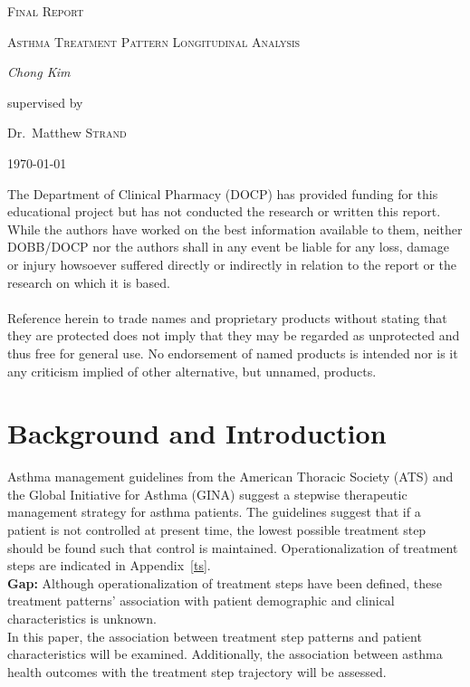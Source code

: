 \documentclass[10pt,a4paper,fleqn]{article}
\author{Chong Kim}
\begin{document}
\begin{titlepage}
\date{}
	\centering

	{\scshape\LARGE Final Report \par}
	\vspace{1cm}
	{\scshape\Large Asthma Treatment Pattern Longitudinal Analysis \par}
	\vspace{1.5cm}

	\vspace{2cm}
	{\Large\itshape Chong Kim\par}
	\vfill
	supervised by\par
	Dr.~Matthew \textsc{Strand}
	\vfill


	{\large \today\par}

\begin{flushleft}
The Department of Clinical Pharmacy (DOCP) has provided funding for this educational project but has not conducted the
research or written this report. While the authors have worked on the best information available to them, neither
DOBB/DOCP nor the authors shall in any event be liable for any loss, damage or injury howsoever suffered directly or
indirectly in relation to the report or the research on which it is based.
\\~\\
Reference herein to trade names and proprietary products without stating that they are protected does not imply
that they may be regarded as unprotected and thus free for general use. No endorsement of named products is
intended nor is it any criticism implied of other alternative, but unnamed, products.
\end{flushleft}

\end{titlepage}

\newpage
\section{Background and Introduction}

Asthma management guidelines from the American Thoracic Society (ATS) and  the Global Initiative for Asthma (GINA) suggest a stepwise therapeutic management strategy for asthma patients\cite{Bateman2008}. The guidelines suggest that if a patient is not controlled at present time, the lowest possible treatment step should be found such that control is maintained. Operationalization of treatment steps are indicated in Appendix~\ref{ts}.  \\
\indent\textbf{Gap:} Although operationalization of treatment steps have been defined, these treatment patterns' association with patient demographic and clinical characteristics is unknown.\\
\indent In this paper, the association between treatment step patterns and patient characteristics will be examined. Additionally, the association between asthma health outcomes with the treatment step trajectory will be assessed.
\end{document}
